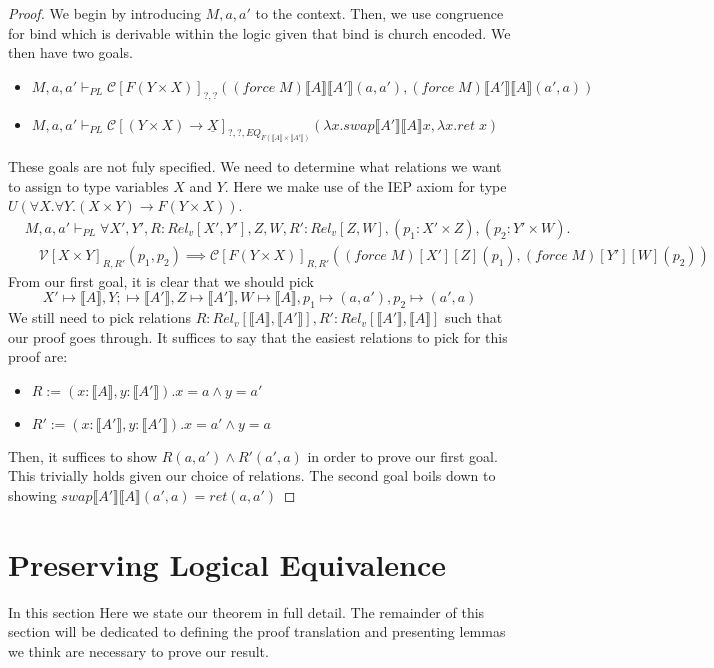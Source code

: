 \documentclass[acmsmall]{acmart}
\newcommand{\den}[1]{\llbracket #1\rrbracket}
\begin{document}
\begin{proof}
  We begin by introducing $M,a,a'$ to the context. Then, we use congruence for bind which is derivable within the logic given that bind is church encoded. We then have two goals.
  \begin{itemize}
    \item $M,a,a' \vdash_{PL} \mathcal{C}[F(Y\times X)]_{?,?}((force\;M)\den{A}\den{A'}(a,a'),(force\;M)\den{A'}\den{A}(a',a))$
    \item $M,a,a' \vdash_{PL} \mathcal{C}[(Y \times X) \to \underline{X}]_{?,?,EQ_{F(\den{A}\times \den{A'})}}(\lambda x. swap\den{A'}\den{A}x , \lambda x. ret\;x)$
  \end{itemize}
These goals are not fuly specified. We need to determine what relations we want to assign to type variables $X$ and $Y$. Here we make use of the IEP axiom for type $U(\forall X. \forall Y. (X \times Y) \to F(Y \times X))$.
\begin{align*} 
&M,a,a' \vdash_{PL} \forall X',Y',R:Rel_v[X',Y'],Z,W,R':Rel_v[Z,W],(p_1 : X' \times Z),(p_2 : Y' \times W).\\
&\quad\mathcal{V}[X\times Y]_{R,R'}(p_1,p_2) \implies \mathcal{C}[F(Y\times X)]_{R,R'}((force\;M)[X'][Z](p_1),(force\;M)[Y'][W](p_2))
\end{align*}
From our first goal, it is clear that we should pick
\[
  X' \mapsto \den{A}, Y; \mapsto \den{A'},Z \mapsto \den{A'}, W \mapsto \den{A}, p_1 \mapsto (a,a'), p_2 \mapsto (a',a)
\]
We still need to pick relations $R : Rel_v[\den{A},\den{A'}],R' : Rel_v[\den{A'},\den{A}]$ such that our proof goes through. It suffices to say that the easiest relations to pick for this proof are:
\begin{itemize}
  \item $R := (x : \den{A},y : \den{A'}). x = a \land y = a'$
  \item $R' := (x : \den{A'},y : \den{A'}). x = a' \land y = a$
\end{itemize}
Then, it suffices to show $R(a,a') \land R'(a',a)$ in order to prove our first goal. This trivially holds given our choice of relations.
The second goal boils down to showing $swap\den{A'}\den{A}(a',a)=ret(a,a')$
\end{proof}





\FloatBarrier

\section{Preserving Logical Equivalence}\label{sec:LogicEquiv}
In this section
Here we state our theorem in full detail. The remainder of this section will be dedicated to defining the proof translation and presenting lemmas we think are necessary to prove our result.
\end{document}
